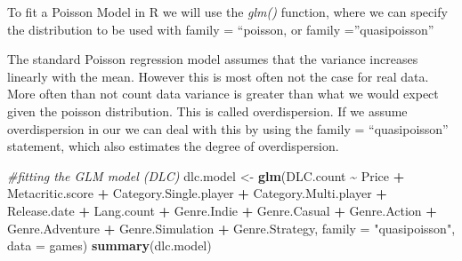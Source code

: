 \documentclass[
]{article}
\newenvironment{Shaded}{\begin{snugshade}}{\end{snugshade}}
\newcommand{\AttributeTok}[1]{\textcolor[rgb]{0.13,0.29,0.53}{#1}}
\newcommand{\CommentTok}[1]{\textcolor[rgb]{0.56,0.35,0.01}{\textit{#1}}}
\newcommand{\FunctionTok}[1]{\textcolor[rgb]{0.13,0.29,0.53}{\textbf{#1}}}
\newcommand{\NormalTok}[1]{#1}
\newcommand{\OtherTok}[1]{\textcolor[rgb]{0.56,0.35,0.01}{#1}}
\newcommand{\SpecialCharTok}[1]{\textcolor[rgb]{0.81,0.36,0.00}{\textbf{#1}}}
\newcommand{\StringTok}[1]{\textcolor[rgb]{0.31,0.60,0.02}{#1}}
\begin{document}
To fit a Poisson Model in R we will use the \emph{glm()} function, where
we can specify the distribution to be used with family = ``poisson, or
family =''quasipoisson''

The standard Poisson regression model assumes that the variance
increases linearly with the mean. However this is most often not the
case for real data. More often than not count data variance is greater
than what we would expect given the poisson distribution. This is called
overdispersion. If we assume overdispersion in our we can deal with this
by using the family = ``quasipoisson'' statement, which also estimates
the degree of overdispersion.

\begin{Shaded}
\begin{Highlighting}[]
\CommentTok{\#fitting the GLM model (DLC)}
\NormalTok{dlc.model }\OtherTok{\textless{}{-}} \FunctionTok{glm}\NormalTok{(DLC.count }\SpecialCharTok{\textasciitilde{}}\NormalTok{ Price }\SpecialCharTok{+}\NormalTok{ Metacritic.score }\SpecialCharTok{+}\NormalTok{ Category.Single.player }\SpecialCharTok{+}\NormalTok{ Category.Multi.player }\SpecialCharTok{+}\NormalTok{ Release.date }\SpecialCharTok{+}\NormalTok{ Lang.count }\SpecialCharTok{+}\NormalTok{ Genre.Indie }\SpecialCharTok{+}\NormalTok{ Genre.Casual }\SpecialCharTok{+}\NormalTok{ Genre.Action }\SpecialCharTok{+}\NormalTok{ Genre.Adventure }\SpecialCharTok{+}\NormalTok{ Genre.Simulation }\SpecialCharTok{+}\NormalTok{ Genre.Strategy, }\AttributeTok{family =} \StringTok{"quasipoisson"}\NormalTok{, }\AttributeTok{data =}\NormalTok{ games)}
\FunctionTok{summary}\NormalTok{(dlc.model)}
\end{Highlighting}
\end{Shaded}
\end{document}
